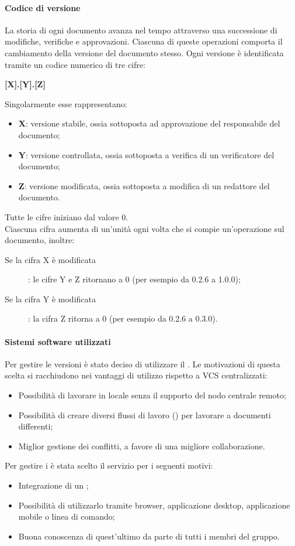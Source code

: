 \paragraph{Codice di versione}
La storia di ogni documento avanza nel tempo attraverso una successione di modifiche, verifiche e approvazioni. Ciascuna di queste operazioni comporta il cambiamento della versione del documento stesso. Ogni versione è identificata tramite un codice numerico di tre cifre:
\begin{center}
\textbf{[X].[Y].[Z]} 
\end{center}
Singolarmente esse rappresentano:
\begin{itemize}
	\item \textbf{X}: versione stabile, ossia sottoposta ad approvazione del responsabile del documento;
  	\item \textbf{Y}: versione controllata, ossia sottoposta a verifica di un verificatore del documento;
  	\item \textbf{Z}: versione modificata, ossia sottoposta a modifica di un redattore del documento.
\end{itemize}
  
Tutte le cifre iniziano dal valore 0. \\ 
Ciascuna cifra aumenta di un'unità ogni volta che si compie un'operazione sul documento, inoltre:
\begin{description}
	\item[Se la cifra X è modificata] : le cifre Y e Z ritornano a 0 (per esempio da 0.2.6 a 1.0.0);
	\item[Se la cifra Y è modificata] : la cifra Z ritorna a 0 (per esempio da 0.2.6 a 0.3.0).
\end{description}

\paragraph{Sistemi software utilizzati}
Per gestire le versioni è stato deciso di utilizzare il  . 
Le motivazioni di questa scelta si racchiudono nei vantaggi di utilizzo rispetto a VCS centralizzati:
\begin{itemize}
	\item Possibilità di lavorare in locale senza il supporto del nodo centrale remoto; 
	\item Possibilità di creare diversi flussi di lavoro () per lavorare a documenti differenti;
	\item Miglior gestione dei conflitti, a favore di una migliore collaborazione.
\end{itemize}
Per gestire i   è stata scelto il servizio  per i seguenti motivi: 
\begin{itemize}
	\item Integrazione di un ;
	\item Possibilità di utilizzarlo tramite browser, applicazione desktop, applicazione mobile o linea di comando;
	\item Buona conoscenza di quest'ultimo da parte di tutti i membri del gruppo.
\end{itemize}

